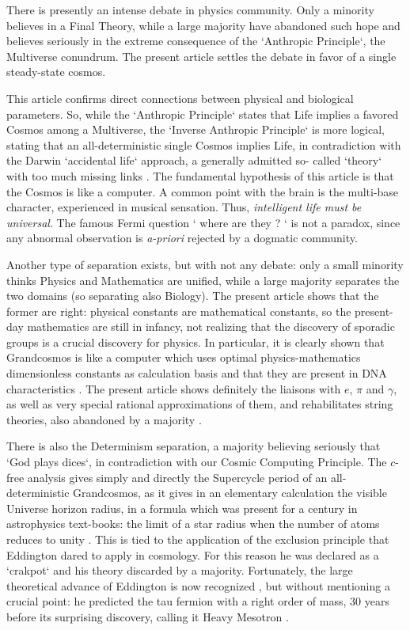 \documentclass[twoside,draft]{article}
\begin{document}
\begin{sloppypar}
There is presently an intense debate in physics community. Only a minority believes in a 
Final Theory, while a large majority have abandoned such hope and believes seriously in the extreme
consequence of the `Anthropic Principle`, the Multiverse conundrum. The present article settles the
debate in favor of a single steady-state cosmos.

This article confirms direct connections \cite{Sanchez1} between physical and biological parameters. So,
while the `Anthropic Principle` states that Life implies a favored Cosmos among a Multiverse, the
`Inverse Anthropic Principle` \cite{Sanchez1} is more logical, stating that an all-deterministic single Cosmos
implies Life, in contradiction with the Darwin `accidental life` approach, a generally admitted so-
called `theory` with too much missing links \cite{Chauvin}. The fundamental hypothesis of
this article is that the Cosmos is like a computer. A common point with the brain is the multi-base
character, experienced in musical sensation. Thus, \textit{intelligent life must be universal}. The famous Fermi
question ` where are they ? ` is not a paradox, since any abnormal observation is \textit{a-priori} rejected by a
dogmatic community.

Another type of separation exists, but with not any debate: only a small minority thinks Physics
and Mathematics are unified, while a large majority separates the two domains (so separating also
Biology). The present article shows that the former are right: physical constants are mathematical
constants, so the present-day mathematics are still in infancy, not realizing that the discovery of
sporadic groups is a crucial discovery for physics. In particular, it is clearly shown that
Grandcosmos is like a computer which uses optimal physics-mathematics dimensionless constants as
calculation basis and that they are present in DNA characteristics \cite{Sanchez1}. The present article shows
definitely the liaisons with $e$, $\pi$ and $\gamma$, as well as very special rational approximations of 
them, and rehabilitates string theories, also abandoned by a majority \cite{Woit}.

There is also the Determinism separation, a majority believing seriously that `God plays dices`,
in contradiction with our Cosmic Computing Principle. The $c$-free analysis gives simply and
directly the Supercycle period of an all-deterministic Grandcosmos, as it gives in an elementary
calculation the visible Universe horizon radius, in a formula which was present for a century in
astrophysics text-books: the limit of a star radius when the number of atoms reduces to unity \cite{Sanchez1}.
This is tied to the application of the exclusion principle that Eddington dared to apply in
cosmology. For this reason he was declared as a `crakpot` and his theory discarded by a majority.
Fortunately, the large theoretical advance of Eddington is now recognized \cite{Larin,Durham}, but without
mentioning a crucial point: he predicted the tau fermion with a right order of mass, 30 years before its surprising discovery, calling it Heavy Mesotron \cite{Carr}.


\end{sloppypar}
\end{document}
